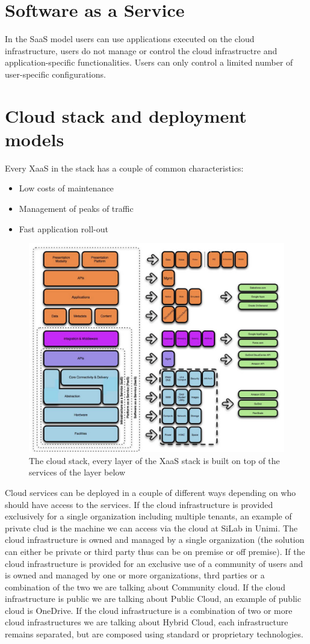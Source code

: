 \section{Software as a Service}
In the SaaS model users can use applications executed on the cloud infrastructure, users do not manage or control the cloud infrastructre and application-specific functionalities. Users can only control a limited number of user-specific configurations.
\section{Cloud stack and deployment models}
Every XaaS in the stack has a couple of common characteristics:
\begin{itemize}
    \item Low costs of maintenance
    \item Management of peaks of traffic
    \item Fast application roll-out
\end{itemize}
\begin{figure}
    \centering
    \includegraphics[scale=0.2]{img/cloud_stack.jpeg}
    \caption{The cloud stack, every layer of the XaaS stack is built on top of the services of the layer below}
\end{figure}
Cloud services can be deployed in a couple of different ways depending on who should have access to the services. \n
If the cloud infrastructure is provided exclusively for a single organization including multiple tenants, an example of private clud is the machine we can access via the cloud at SiLab in Unimi. The cloud infrastructure is owned and managed by a single organization (the solution can either be private or third party thus can be on premise or off premise). \n
If the cloud infrastructure is provided for an exclusive use of a community of users and is owned and managed by one or more organizations, thrd parties or a combination of the two we are talking about Community cloud. \n
If the cloud infrastructure is public we are talking about Public Cloud, an example of public cloud is OneDrive. \n
If the cloud infrastructure is a combination of two or more cloud infrastructures we are talking about Hybrid Cloud, each infrastructure remains separated, but are composed using standard or proprietary technologies. \n